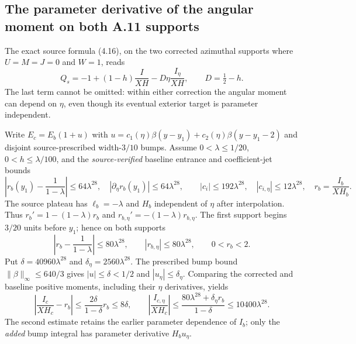 \subsection*{The parameter derivative of the angular moment on both A.11 supports}
\label{subsec:A11-angular-moment-eta-derivative}
The exact source formula (4.16), on the two corrected azimuthal
supports where $U=M=J=0$ and $W=1$, reads
\begin{equation}\label{eq:A11-Q-retain-eta}
Q_s=-1+(1-h)\frac I{XH}-D\eta\frac{I_\eta}{XH},
\qquad D=\tfrac12-h.
\end{equation}
The last term cannot be omitted: within either correction the
angular moment can depend on $\eta$, even though its eventual
exterior target is parameter independent.

Write $E_c=E_b(1+u)$ with
$u=c_1(\eta)\beta(y-y_1)+c_2(\eta)\beta(y-y_1-2)$
and disjoint source-prescribed width-$3/10$ bumps.
Assume $0<\lambda\le1/20$, $0<h\le\lambda/100$, and the
\emph{source-verified} baseline entrance and coefficient-jet bounds
\[
\left|r_b(y_1)-\frac1{1-\lambda}\right|\le64\lambda^{28},
\quad |\partial_\eta r_b(y_1)|\le64\lambda^{28},\qquad
|c_i|\le192\lambda^{28},\quad|c_{i,\eta}|\le12\lambda^{28},
\quad r_b=\frac{I_b}{XH_b}.
\]
The source plateau has $\ell_b=-\lambda$ and $H_b$ independent of
$\eta$ after interpolation. Thus
$r_b'=1-(1-\lambda)r_b$ and
$r_{b,\eta}'=-(1-\lambda)r_{b,\eta}$.
The first support begins $3/20$ units before $y_1$; hence on both
supports
\[
\left|r_b-\frac1{1-\lambda}\right|\le80\lambda^{28},
\qquad |r_{b,\eta}|\le80\lambda^{28},\qquad0<r_b<2.
\]
Put $\delta=40960\lambda^{28}$ and
$\delta_\eta=2560\lambda^{28}$. The prescribed bump bound
$\|\beta\|_\infty\le640/3$ gives $|u|\le\delta<1/2$ and
$|u_\eta|\le\delta_\eta$. Comparing the corrected and baseline
positive moments, including their $\eta$ derivatives, yields
\begin{equation}\label{eq:A11-Q-moment-jet}
\left|\frac{I_c}{XH_c}-r_b\right|
\le\frac{2\delta}{1-\delta}r_b\le8\delta,\qquad
\left|\frac{I_{c,\eta}}{XH_c}\right|
\le\frac{80\lambda^{28}+\delta_\eta r_b}{1-\delta}
\le10400\lambda^{28}.
\end{equation}
The second estimate retains the earlier parameter dependence of
$I_b$; only the \emph{added} bump integral has parameter derivative
$H_bu_\eta$.

